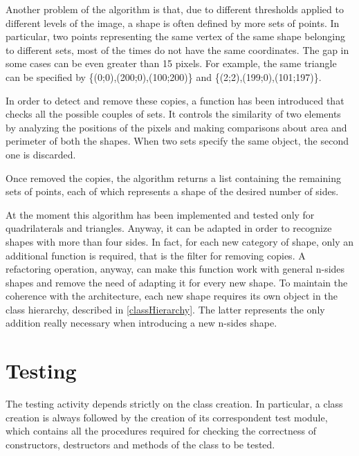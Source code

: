 		
		

		
		


		
		
		
		
		Another problem of the algorithm is that, due to different thresholds applied to different levels of the image, a shape is often defined by more sets of points.
		In particular, two points representing the same vertex of the same shape belonging to different sets, most of the times do not have the same coordinates.
		The gap in some cases can be even greater than 15 pixels. 
		For example, the same triangle can be specified by \{(0;0),(200;0),(100;200)\} and \{(2;2),(199;0),(101;197)\}. 
		
		

		In order to detect and remove these copies, a function has been introduced that checks all the possible couples of sets. 
		It controls the similarity of two elements by analyzing the positions of the pixels and making comparisons about area and perimeter of both the shapes. 
		When two sets specify the same object, the second one is discarded. 
		
		Once removed the copies, the algorithm returns a list containing the remaining sets of points, each of which represents a shape of the desired number of sides.

		At the moment this algorithm has been implemented and tested only for quadrilaterals and triangles. 
		Anyway, it can be adapted in order to recognize shapes with more than four sides.
		In fact, for each new category of shape, only an additional function is required, that is the filter for removing copies. 
		A refactoring operation, anyway, can make this function work with general n-sides shapes and remove the need of adapting it for every new shape.
		To maintain the coherence with the architecture, each new shape requires its own object in the class hierarchy, described in \ref{classHierarchy}. 
		The latter represents the only addition really necessary when introducing a new n-sides shape.
		


	\section{Testing}
	The testing activity depends strictly on the class creation.
	In particular, a class creation is always followed by the creation of its correspondent test module, which contains all the procedures required for checking the correctness of constructors, destructors and methods of the class to be tested.
	
